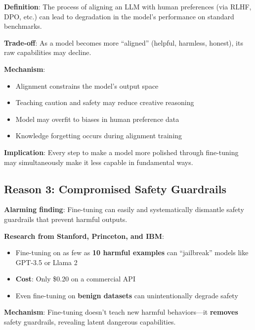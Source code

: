 \documentclass{article}
\begin{document}
\begin{tcolorbox}[colback=red!5!white, colframe=red!75!black, title=The Alignment Tax]
\textbf{Definition}: The process of aligning an LLM with human preferences (via RLHF, DPO, etc.) can lead to degradation in the model's performance on standard benchmarks.

\textbf{Trade-off}: As a model becomes more ``aligned'' (helpful, harmless, honest), its raw capabilities may decline.
\end{tcolorbox}

\textbf{Mechanism}:
\begin{itemize}
\item Alignment constrains the model's output space
\item Teaching caution and safety may reduce creative reasoning
\item Model may overfit to biases in human preference data
\item Knowledge forgetting occurs during alignment training
\end{itemize}

\textbf{Implication}: Every step to make a model more polished through fine-tuning may simultaneously make it less capable in fundamental ways.

\subsection{Reason 3: Compromised Safety Guardrails}

\begin{tcolorbox}[colback=red!10!white, colframe=red!75!black, title=Critical Security Risk]
\textbf{Alarming finding}: Fine-tuning can easily and systematically dismantle safety guardrails that prevent harmful outputs.

\textbf{Research from Stanford, Princeton, and IBM}:
\begin{itemize}
\item Fine-tuning on as few as \textbf{10 harmful examples} can ``jailbreak'' models like GPT-3.5 or Llama 2
\item \textbf{Cost}: Only \$0.20 on a commercial API
\item Even fine-tuning on \textbf{benign datasets} can unintentionally degrade safety
\end{itemize}

\textbf{Mechanism}: Fine-tuning doesn't teach new harmful behaviors---it \textbf{removes} safety guardrails, revealing latent dangerous capabilities.
\end{tcolorbox}
\end{document}
